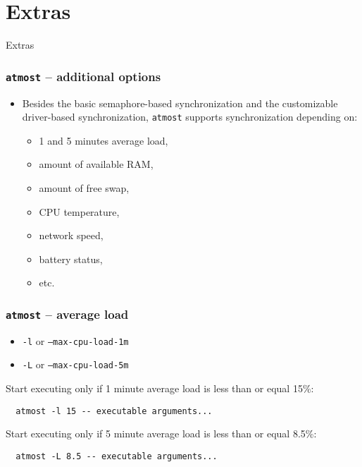 \documentclass[compress,table,xcolor=table]{beamer}
\newcommand{\shelltext}[1]{\texttt{\colorbox{light-gray}{#1}}}
\begin{document}
\section{Extras}
\begin{frame}
  \centering
  \Huge
  Extras
\end{frame}
\begin{frame}
  \frametitle{\shelltext{atmost} -- additional options}
  \begin{itemize}
    \Large
    \item Besides the basic semaphore-based synchronization and the customizable
      driver-based synchronization, \shelltext{atmost} supports synchronization
      depending on:
    \begin{itemize}
      \large
      \item 1 and 5 minutes average load,
      \item amount of available RAM,
      \item amount of free swap,
      \item CPU temperature,
      \item network speed,
      \item battery status,
      \item etc.
    \end{itemize}
  \end{itemize}
\end{frame}
\begin{frame}[fragile]
  \frametitle{\shelltext{atmost} -- average load}
  \begin{itemize}
    \item \shelltext{-l} or \shelltext{--max-cpu-load-1m}
    \item \shelltext{-L} or \shelltext{--max-cpu-load-5m}
  \end{itemize}

  \large
  Start executing only if 1 minute average load is less than or equal 15\%:
  \normalsize
  \begin{lstlisting}
  atmost -l 15 -- executable arguments...
  \end{lstlisting}

  \large
  Start executing only if 5 minute average load is less than or equal 8.5\%:
  \normalsize
  \begin{lstlisting}
  atmost -L 8.5 -- executable arguments...
  \end{lstlisting}
\end{frame}
\end{document}
